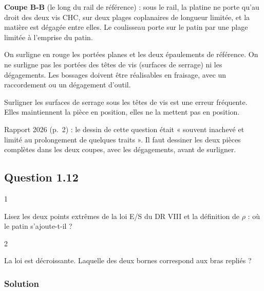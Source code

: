 \documentclass[11pt,a4paper]{article}
\begin{document}
\textbf{Coupe B-B} (le long du rail de référence) : sous le rail, la platine ne porte qu'au droit des deux vis CHC, sur deux plages coplanaires de longueur limitée, et la matière est dégagée entre elles. Le coulisseau porte sur le patin par une plage limitée à l'emprise du patin.

On surligne en rouge les portées planes et les deux épaulements de référence. On ne surligne pas les portées des têtes de vis (surfaces de serrage) ni les dégagements. Les bossages doivent être réalisables en fraisage, avec un raccordement ou un dégagement d'outil.

\begin{piege}

Surligner les surfaces de serrage sous les têtes de vis est une erreur fréquente. Elles maintiennent la pièce en position, elles ne la mettent pas en position.

\end{piege}

\begin{jury}

Rapport 2026 (p.~2) : le dessin de cette question était « souvent inachevé et limité au prolongement de quelques traits ». Il faut dessiner les deux pièces complètes dans les deux coupes, avec les dégagements, avant de surligner.

\end{jury}

\hypertarget{question-1.12}{%
\subsection{Question 1.12}\label{question-1.12}}

\begin{indication}{1}

Lisez les deux points extrêmes de la loi E/S du DR VIII et la définition de \(\rho\) : où le patin s'ajoute-t-il ?

\end{indication}

\begin{indication}{2}

La loi est décroissante. Laquelle des deux bornes correspond aux bras repliés ?

\end{indication}

\hypertarget{solution-11}{%
\subsubsection{Solution}\label{solution-11}}
\end{document}
